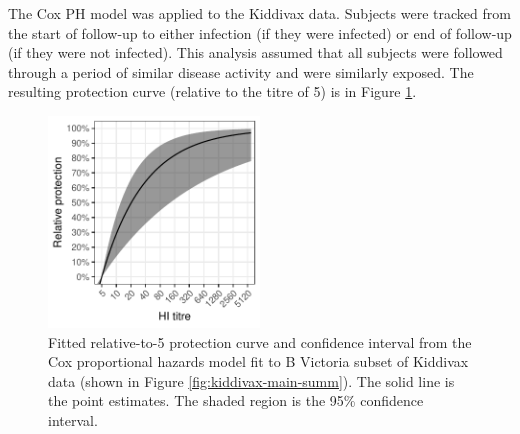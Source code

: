 The Cox PH model was applied to the Kiddivax data. Subjects were tracked from the start of follow-up to either infection (if they were infected) or end of follow-up (if they were not infected). This analysis assumed that all subjects were followed through a period of similar disease activity and were similarly exposed. The resulting protection curve (relative to the titre of 5) is in Figure \ref{fig:kiddyvaxmain-cox}.

\begin{figure}[htp]
    \centering
    \includegraphics[width=0.5\textwidth]{../fit-cox-plot/kiddyvaxmain-bvic.pdf}
    \caption{
        Fitted relative-to-5 protection curve and confidence interval from the Cox proportional hazards model fit to B Victoria subset of Kiddivax data (shown in Figure \ref{fig:kiddivax-main-summ}). The solid line is the point estimates. The shaded region is the 95\% confidence interval.
    }
    \label{fig:kiddyvaxmain-cox}
\end{figure}

